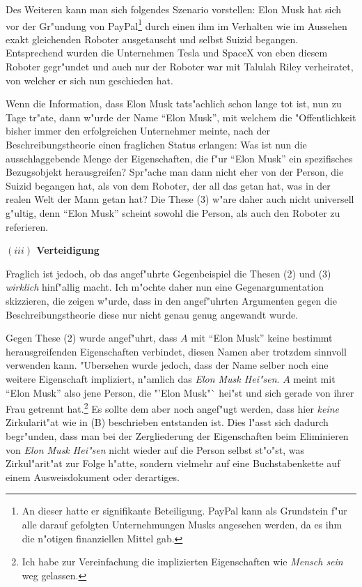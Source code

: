 \documentclass[a4paper, emulatestandardclasses, 12pt]{scrartcl}
\begin{document}
\begin{onehalfspace}
Des Weiteren kann man sich folgendes Szenario vorstellen: Elon Musk hat sich vor der Gr"undung von PayPal\footnote{An dieser hatte er signifikante Beteiligung. PayPal kann als Grundstein f"ur alle darauf gefolgten Unternehmungen Musks angesehen werden, da es ihm die n"otigen finanziellen Mittel gab.} durch einen ihm im Verhalten wie im Aussehen exakt gleichenden Roboter ausgetauscht und selbst Suizid begangen.  Entsprechend wurden die Unternehmen Tesla und SpaceX von eben diesem Roboter gegr"undet und auch nur der Roboter war mit Talulah Riley verheiratet, von welcher er sich nun geschieden hat.

Wenn die Information, dass Elon Musk tats"achlich schon lange tot ist, nun zu Tage tr"ate, dann w"urde der Name "`Elon Musk"', mit welchem die "Offentlichkeit bisher immer den erfolgreichen Unternehmer meinte, nach der Beschreibungstheorie einen fraglichen Status erlangen: Was ist nun die ausschlaggebende Menge der Eigenschaften, die f"ur "`Elon Musk"' ein spezifisches Bezugsobjekt herausgreifen? Spr"ache man dann nicht eher von der Person, die Suizid begangen hat, als von dem Roboter, der all das getan hat, was in der realen Welt der Mann getan hat? Die These (3) w"are daher auch nicht universell g"ultig, denn "`Elon Musk"' scheint sowohl die Person, als auch den Roboter zu referieren.

\vspace{5mm}
\noindent\textbf{$(iii)$ Verteidigung}	

\noindent Fraglich ist jedoch, ob das angef"uhrte Gegenbeispiel die Thesen (2) und (3) \emph{wirklich} hinf"allig macht. Ich m"ochte daher nun eine Gegenargumentation skizzieren, die zeigen w"urde, dass in den angef"uhrten Argumenten gegen die Beschreibungstheorie diese nur nicht genau genug angewandt wurde.

Gegen These (2) wurde angef"uhrt, dass $A$ mit "`Elon Musk"' keine bestimmt herausgreifenden Eigenschaften verbindet, diesen Namen aber trotzdem sinnvoll verwenden kann. "Ubersehen wurde jedoch, dass der Name selber noch eine weitere Eigenschaft impliziert, n"amlich das \emph{Elon Musk Hei"sen}. $A$ meint mit "`Elon Musk"' also jene Person, die "'Elon Musk"` hei"st und sich gerade von ihrer Frau getrennt hat.\footnote{Ich habe zur Vereinfachung die implizierten Eigenschaften wie \emph{Mensch sein} weg gelassen.} Es sollte dem aber noch angef"ugt werden, dass hier \emph{keine} Zirkularit"at wie in (B) beschrieben entstanden ist. Dies l"asst sich dadurch begr"unden, dass man bei der Zergliederung der Eigenschaften beim Eliminieren von \emph{Elon Musk Hei"sen} nicht wieder auf die Person selbst st"o"st, was Zirkul"arit"at zur Folge h"atte, sondern vielmehr auf eine Buchstabenkette auf einem Ausweisdokument oder derartiges.


\end{onehalfspace}
\end{document}
